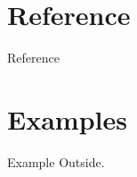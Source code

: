 \documentclass[aspectratio=1610,xcolor={dvipsnames},hyperref={colorlinks,unicode,linkcolor=violet,anchorcolor=BlueViolet,citecolor=YellowOrange,filecolor=black,urlcolor=Aquamarine}]{beamer}
\begin{document}
\section{Reference}
\label{sec:orgcc95b53}

\begin{frame}[allowframebreaks]{Reference}
\printbibliography
\end{frame}

\section{Examples}
\label{sec:org9e588db}

\begin{frame}[label={sec:orgaf882d5}]{Example}
Outside.
\end{frame}
\end{document}

